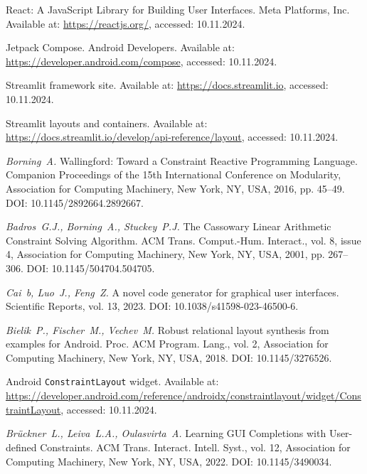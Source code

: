 React: A JavaScript Library for Building User Interfaces. Meta Platforms, Inc. Available at: \url{https://reactjs.org/}, accessed: 10.11.2024.

Jetpack Compose. Android Developers. Available at: \url{https://developer.android.com/compose}, accessed: 10.11.2024.


Streamlit framework site. Available at: \url{https://docs.streamlit.io}, accessed: 10.11.2024.


Streamlit layouts and containers. Available at: \url{https://docs.streamlit.io/develop/api-reference/layout}, accessed: 10.11.2024.

{\em Borning~A.} Wallingford: Toward a Constraint Reactive Programming Language. Companion Proceedings of the 15th International Conference on Modularity, Association for Computing Machinery, New York, NY, USA, 2016, pp. 45--49. DOI: 10.1145/2892664.2892667.

{\em Badros~G.J., Borning~A., Stuckey~P.J.} The Cassowary Linear Arithmetic Constraint Solving Algorithm. ACM Trans. Comput.-Hum. Interact., vol. 8, issue 4, Association for Computing Machinery, New York, NY, USA, 2001, pp. 267--306. DOI: 10.1145/504704.504705.

{\em Cai~b, Luo~J., Feng~Z.} A novel code generator for graphical user interfaces. Scientific Reports, vol. 13, 2023. DOI: 10.1038/s41598-023-46500-6.

{\em Bielik~P., Fischer~M., Vechev~M.} Robust relational layout synthesis from examples for Android. Proc. ACM Program. Lang., vol. 2, Association for Computing Machinery, New York, NY, USA, 2018. DOI: 10.1145/3276526.

Android \texttt{ConstraintLayout} widget. Available at: \url{https://developer.android.com/reference/androidx/constraintlayout/widget/ConstraintLayout}, accessed: 10.11.2024.

{\em Br\"{u}ckner~L., Leiva~L.A., Oulasvirta~A.} Learning GUI Completions with User-defined Constraints. ACM Trans. Interact. Intell. Syst., vol. 12, Association for Computing Machinery, New York, NY, USA, 2022. DOI: 10.1145/3490034.

